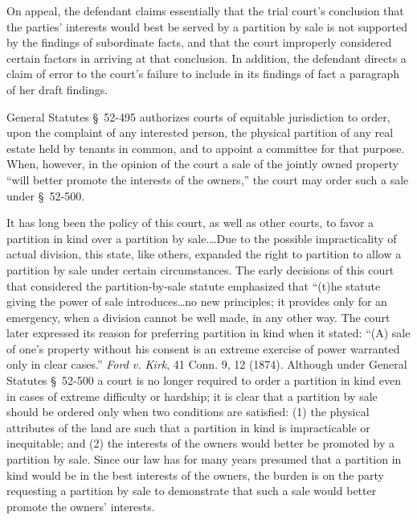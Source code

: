 On appeal, the defendant claims essentially that the trial court's conclusion
that the parties' interests would best be served by a partition by sale is not
supported by the findings of subordinate facts, and that the court improperly
considered certain factors in arriving at that conclusion. In addition, the
defendant directs a claim of error to the court's failure to include in its
findings of fact a paragraph of her draft findings.

General Statutes \S~52-495 authorizes courts of equitable jurisdiction to order,
upon the complaint of any interested person, the physical partition of any real
estate held by tenants in common, and to appoint a committee for that
purpose. When, however, in the opinion of the court a sale of the
jointly owned property ``will better promote the interests of the owners,'' the
court may order such a sale under \S~52-500.

It has long been the policy of this court, as well as other courts, to favor a
partition in kind over a partition by sale.\dots Due to the possible
impracticality of actual division, this state, like others, expanded the right
to partition to allow a partition by sale under certain circumstances. The
early decisions of this court that considered the partition-by-sale statute
emphasized that ``(t)he statute giving the power of sale introduces\dots no
new principles; it provides only for an emergency, when a division cannot be
well made, in any other way. The court later expressed its reason for
preferring partition in kind when it stated: ``(A) sale of one's property
without his consent is an extreme exercise of power warranted only in clear
cases.'' \emph{Ford v. Kirk}, 41 Conn. 9, 12 (1874). Although under General
Statutes \S~52-500 a court is no longer required to order a partition in kind
even in cases
of extreme difficulty or hardship; it is clear that a partition by sale should
be ordered only when two conditions are satisfied: (1) the physical attributes
of the land are such that a partition in kind is impracticable or inequitable;
and (2) the interests of the owners would better be promoted by a partition by
sale. Since our law has for many years presumed that a partition in kind would
be in the best interests of the owners, the burden is on the party requesting a
partition by sale to demonstrate that such a sale would better promote the
owners' interests.

